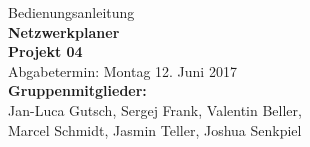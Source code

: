 \documentclass[parskip=half]{scrartcl}
\newcommand{\autoren}{Jan-Luca Gutsch, Sergej Frank, Valentin Beller, \\Marcel Schmidt, Jasmin Teller, Joshua Senkpiel}
\newcommand{\titel}{Bedienungsanleitung}
\newcommand{\untertitel}{Netzwerkplaner}
\newcommand{\Projekt}{Projekt 04}
\begin{document}
\begin{titlepage}
\begin{center}
\Large{\titel}\\[12ex]
\Large{\textbf{\untertitel}}\\[2ex]
\huge{\textbf{\Projekt}}\\[1.5ex]
\normalsize
Abgabetermin: Montag 12. Juni 2017\\[3em]
\textbf{Gruppenmitglieder:}\\
\autoren \\[5ex]
\end{center}
\end{titlepage}
\tableofcontents
\clearpage










\end{document}
